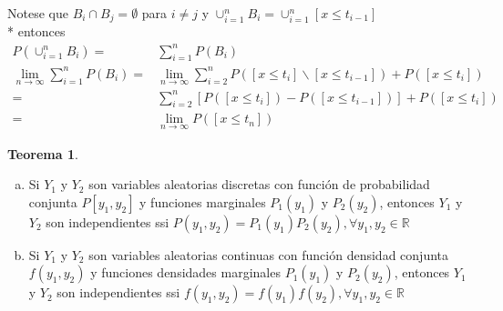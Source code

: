 \documentclass[12pt,letterpaper]{article}
\theoremstyle{definition}
\newtheorem{theorem}{Teorema}[section]
\begin{document}
Notese que $B_i\cap B_j=\emptyset$ para $i\neq j$ y $\cup^n_{i=1}B_i=\cup^n_{i=1}[x\leq t_{i-1}]$\\*
entonces 
\[
\begin{array}{rl}
	P\left(\cup^{n}_{i=1}B_i\right)=&\sum^{n}_{i=1}P(B_i)\\
	\lim\limits_{n\to \infty} \sum^{n}_{i=1}P(B_i)=& \lim\limits_{n\to \infty}\sum^{n}_{i=2}P([x\leq t_i]\smallsetminus [x\leq t_{i-1}])+P([x\leq t_i])\\
	=& \sum^{n}_{i=2}\left[P([x\leq t_i])-P([x\leq t_{i-1}])\right]+P([x\leq t_i])\\
	=& \lim\limits_{n\to \infty} P([x\leq t_n])
\end{array}
\]

\begin{theorem}
	\begin{enumerate}[a)]
		\item Si $Y_1$ y $Y_2$ son variables aleatorias discretas con función de probabilidad conjunta $P[y_1,y_2]$ y funciones marginales $P_1(y_1)$ y $P_2(y_2)$, entonces $Y_1$ y $Y_2$ son independientes ssi $P(y_1,y_2)=P_1(y_1)P_2(y_2),\forall y_1,y_2\in \mathbb{R}$
		\item Si $Y_1$ y $Y_2$ son variables aleatorias continuas con función densidad conjunta $f(y_1,y_2)$ y funciones densidades marginales $P_1(y_1)$ y $P_2(y_2)$, entonces $Y_1$ y $Y_2$ son independientes ssi $f(y_1,y_2)=f(y_1)f(y_2),\forall y_1,y_2\in \mathbb{R}$
	\end{enumerate}
\end{theorem}
\end{document}

